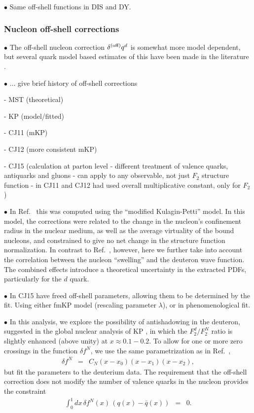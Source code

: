\documentclass[aps,prd,amsmath,preprint]{revtex4}
\begin{document}
$\bullet$
Same off-shell functions in DIS and DY.



\subsubsection{Nucleon off-shell corrections}

$\bullet$
The off-shell nucleon correction $\delta^{(\rm off)} q^d$ is somewhat
more model dependent, but several quark model based estimates of this
have been made in the literature \cite{KP06, GL92, MSTplb}.


$\bullet$
... give brief history of off-shell corrections

- MST (theoretical)

- KP (model/fitted)

- CJ11 (mKP)

- CJ12 (more consistent mKP)

- CJ15 (calculation at parton level - different treatment of 
  valence quarks, antiquarks and gluons - can apply to any
  observable, not just $F_2$ structure function - in CJ11 and CJ12
  had used overall multiplicative constant, only for $F_2$)



$\bullet$
In Ref.~\cite{CJ11} this was computed using the ``modified Kulagin-Petti''
model.
In this model, the corrections were related to the change in the
nucleon's confinement radius in the nuclear medium, as well as the
average virtuality of the bound nucleons, and constrained to give no
net change in the structure function normalization.  In contrast to
Ref.~\cite{CJ11}, however, here we further take into account the
correlation between the nucleon ``swelling'' and the deuteron wave
function.  The combined effects introduce a theoretical uncertainty
in the extracted PDFs, particularly for the $d$ quark. 


$\bullet$
In CJ15 have freed off-shell parameters, allowing them to be determined
by the fit. Using either fmKP model (rescaling parameter $\lambda$),
or in phenomenological fit.


$\bullet$
In this analysis, we explore the possibility of antishadowing in the
deuteron, suggested in the global nuclear analysis of KP \cite{KP06},
in which the $F_2^d/F_2^N$ ratio is slightly enhanced (above unity)
at $x \approx 0.1-0.2$.
To allow for one or more zero crossings in the function $\delta f^N$,
we use the same parametrization as in Ref.~\cite{KP06},
%
\begin{eqnarray}
\delta f^N
&=& C_N (x-x_0) (x-x_1) (x-x_2),
\label{eq:delffit}
\end{eqnarray}
%
but fit the parameters to the deuterium data.
The requirement that the off-shell correction does not modify the
number of valence quarks in the nucleon provides the constraint
%
\begin{eqnarray}
\int_0^1 dx\, \delta f^N(x)\, (q(x)-\bar q(x)) &=& 0.
\label{eq:norm}
\end{eqnarray}
%
\end{document}
